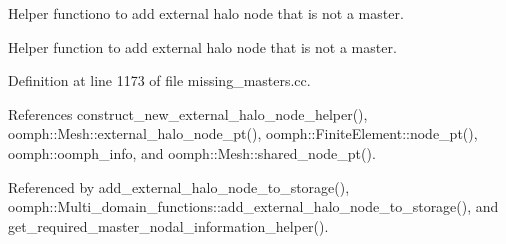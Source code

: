 Helper functiono to add external halo node that is not a master. 

Helper function to add external halo node that is not a master. 

Definition at line 1173 of file missing\+\_\+masters.\+cc.



References construct\+\_\+new\+\_\+external\+\_\+halo\+\_\+node\+\_\+helper(), oomph\+::\+Mesh\+::external\+\_\+halo\+\_\+node\+\_\+pt(), oomph\+::\+Finite\+Element\+::node\+\_\+pt(), oomph\+::oomph\+\_\+info, and oomph\+::\+Mesh\+::shared\+\_\+node\+\_\+pt().



Referenced by add\+\_\+external\+\_\+halo\+\_\+node\+\_\+to\+\_\+storage(), oomph\+::\+Multi\+\_\+domain\+\_\+functions\+::add\+\_\+external\+\_\+halo\+\_\+node\+\_\+to\+\_\+storage(), and get\+\_\+required\+\_\+master\+\_\+nodal\+\_\+information\+\_\+helper().

\mbox{\label{namespaceoomph_1_1Missing__masters__functions_a9510959d4583c82a516d520c9da35a93}} 
